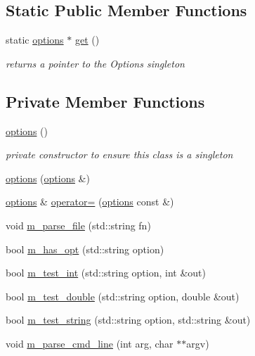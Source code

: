 \subsection*{Static Public Member Functions}
\begin{DoxyCompactItemize}
\item 
static \hyperlink{classoptions}{options} $\ast$ \hyperlink{classoptions_a9ecfe9c365269df68a41b961c31ae3f5}{get} ()
\begin{DoxyCompactList}\small\item\em returns a pointer to the Options singleton \end{DoxyCompactList}\end{DoxyCompactItemize}
\subsection*{Private Member Functions}
\begin{DoxyCompactItemize}
\item 
\hyperlink{classoptions_a41a256b4ba3b2d68a2d72b9245aa0c4d}{options} ()
\begin{DoxyCompactList}\small\item\em private constructor to ensure this class is a singleton \end{DoxyCompactList}\item 
\hyperlink{classoptions_a561b67397b31bd4ec2c058ad54ab2daa}{options} (\hyperlink{classoptions}{options} \&)
\item 
\hyperlink{classoptions}{options} \& \hyperlink{classoptions_ad3323d598a23707733c16be8a575c270}{operator=} (\hyperlink{classoptions}{options} const \&)
\item 
void \hyperlink{classoptions_abeab2c3e2cf5c1809e09601a3835d967}{m\+\_\+parse\+\_\+file} (std\+::string fn)
\item 
bool \hyperlink{classoptions_a99183ba43c8d7b35dbfa1bea0f43db48}{m\+\_\+has\+\_\+opt} (std\+::string option)
\item 
bool \hyperlink{classoptions_ad9b4461e633b73acc2fde7752ef60d41}{m\+\_\+test\+\_\+int} (std\+::string option, int \&out)
\item 
bool \hyperlink{classoptions_a0eebdb8dbce454720ef9251fcd7abf24}{m\+\_\+test\+\_\+double} (std\+::string option, double \&out)
\item 
bool \hyperlink{classoptions_a8286a8617eec86a3d4cf678bd17739ba}{m\+\_\+test\+\_\+string} (std\+::string option, std\+::string \&out)
\item 
void \hyperlink{classoptions_a441540f2a8990edaa17fe95b013f9168}{m\+\_\+parse\+\_\+cmd\+\_\+line} (int arg, char $\ast$$\ast$argv)
\end{DoxyCompactItemize}
